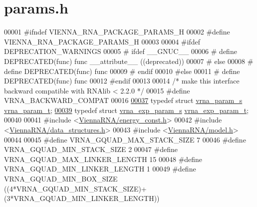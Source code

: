 \hypertarget{params_8h_source}{}\section{params.\+h}
\label{params_8h_source}

\begin{DoxyCode}
00001 \textcolor{preprocessor}{#ifndef VIENNA\_RNA\_PACKAGE\_PARAMS\_H}
00002 \textcolor{preprocessor}{#define VIENNA\_RNA\_PACKAGE\_PARAMS\_H}
00003 
00004 \textcolor{preprocessor}{#ifdef DEPRECATION\_WARNINGS}
00005 \textcolor{preprocessor}{# ifdef \_\_GNUC\_\_}
00006 \textcolor{preprocessor}{#  define DEPRECATED(func) func \_\_attribute\_\_ ((deprecated))}
00007 \textcolor{preprocessor}{# else}
00008 \textcolor{preprocessor}{#  define DEPRECATED(func) func}
00009 \textcolor{preprocessor}{# endif}
00010 \textcolor{preprocessor}{#else}
00011 \textcolor{preprocessor}{# define DEPRECATED(func) func}
00012 \textcolor{preprocessor}{#endif}
00013 
00014 \textcolor{comment}{/* make this interface backward compatible with RNAlib < 2.2.0 */}
00015 \textcolor{preprocessor}{#define VRNA\_BACKWARD\_COMPAT}
00016 
\hypertarget{params_8h_source.tex_l00037}{}\hyperlink{group__energy__parameters_ga8a69ca7d787e4fd6079914f5343a1f35}{00037} \textcolor{keyword}{typedef} \textcolor{keyword}{struct  }\hyperlink{group__energy__parameters_structvrna__param__s}{vrna\_param\_s}       \hyperlink{group__energy__parameters_structvrna__param__s}{vrna\_param\_t};
\hypertarget{params_8h_source.tex_l00039}{}\hyperlink{group__energy__parameters_ga01d8b92fe734df8d79a6169482c7d8d8}{00039} \textcolor{keyword}{typedef} \textcolor{keyword}{struct  }\hyperlink{group__energy__parameters_structvrna__exp__param__s}{vrna\_exp\_param\_s}   \hyperlink{group__energy__parameters_structvrna__exp__param__s}{vrna\_exp\_param\_t};
00040 
00041 \textcolor{preprocessor}{#include <\hyperlink{energy__const_8h}{ViennaRNA/energy\_const.h}>}
00042 \textcolor{preprocessor}{#include <\hyperlink{data__structures_8h}{ViennaRNA/data\_structures.h}>}
00043 \textcolor{preprocessor}{#include <\hyperlink{model_8h}{ViennaRNA/model.h}>}
00044 
00045 \textcolor{preprocessor}{#define   VRNA\_GQUAD\_MAX\_STACK\_SIZE     7}
00046 \textcolor{preprocessor}{#define   VRNA\_GQUAD\_MIN\_STACK\_SIZE     2}
00047 \textcolor{preprocessor}{#define   VRNA\_GQUAD\_MAX\_LINKER\_LENGTH  15}
00048 \textcolor{preprocessor}{#define   VRNA\_GQUAD\_MIN\_LINKER\_LENGTH  1}
00049 \textcolor{preprocessor}{#define   VRNA\_GQUAD\_MIN\_BOX\_SIZE       ((4*VRNA\_GQUAD\_MIN\_STACK\_SIZE)+(3*VRNA\_GQUAD\_MIN\_LINKER\_LENGTH))}

\end{DoxyCode}
